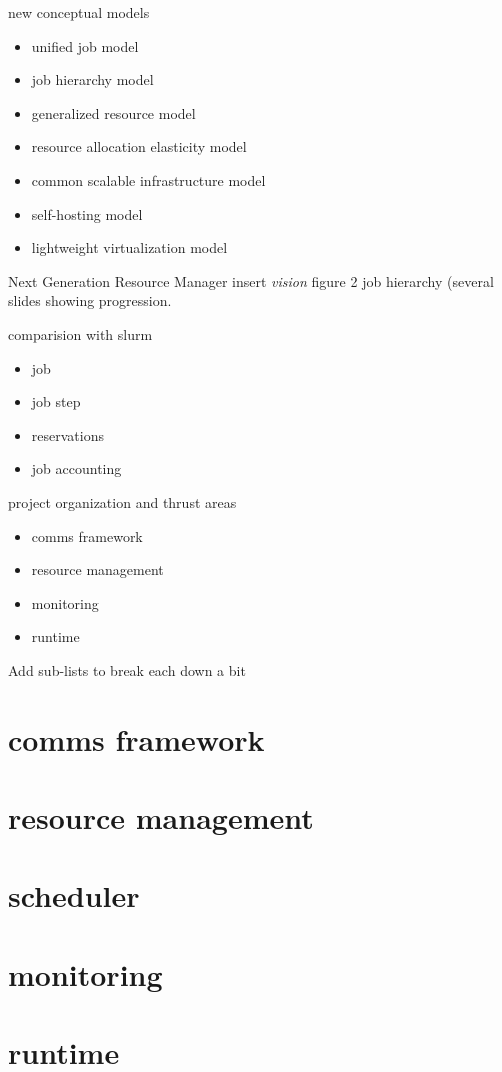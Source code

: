 \documentclass[default,pdf,colorBG,slideColor]{prosper}
\begin{document}
\begin{slide}{new conceptual models}{\small
\begin{itemize}
  \item{unified job model}
  \item{job hierarchy model}
  \item{generalized resource model}
  \item{resource allocation elasticity model}
  \item{common scalable infrastructure model}
  \item{self-hosting model}
  \item{lightweight virtualization model}
\end{itemize}
}\end{slide}
\begin{slide}{Next Generation Resource Manager}{\small
insert {\em vision} figure 2 job hierarchy (several slides showing
progression.
}\end{slide}
\begin{slide}{comparision with slurm}{\small
\begin{itemize}
  \item{job}
  \item{job step}
  \item{reservations}
  \item{job accounting}
\end{itemize}
}\end{slide}
\begin{slide}{project organization and thrust areas}{\small
\begin{itemize}
  \item{comms framework}
  \item{resource management}
  \item{monitoring}
  \item{runtime}
\end{itemize}
Add sub-lists to break each down a bit
}\end{slide}
\part{comms framework}
\part{resource management}
\part{scheduler}
\part{monitoring}
\part{runtime}
\end{document}
